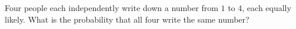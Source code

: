 Four people each independently write down a number from $1$ to $4$, each equally likely. What is the probability that all four write the same number?
